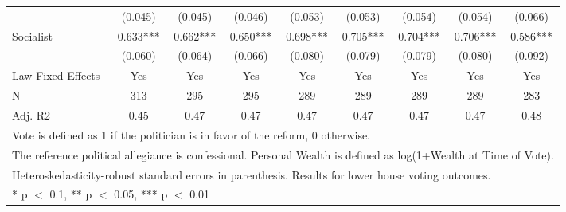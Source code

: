 \begin{table}
\begin{tabular}[t]{lcccccccc}
 & (\num{0.045}) & (\num{0.045}) & (\num{0.046}) & (\num{0.053}) & (\num{0.053}) & (\num{0.054}) & (\num{0.054}) & (\num{0.066})\\
Socialist & \num{0.633}*** & \num{0.662}*** & \num{0.650}*** & \num{0.698}*** & \num{0.705}*** & \num{0.704}*** & \num{0.706}*** & \num{0.586}***\\
 & (\num{0.060}) & (\num{0.064}) & (\num{0.066}) & (\num{0.080}) & (\num{0.079}) & (\num{0.079}) & (\num{0.080}) & (\num{0.092})\\
\midrule
Law Fixed Effects & Yes & Yes & Yes & Yes & Yes & Yes & Yes & Yes\\
N & \num{313} & \num{295} & \num{295} & \num{289} & \num{289} & \num{289} & \num{289} & \num{283}\\
Adj. R2 & \num{0.45} & \num{0.47} & \num{0.47} & \num{0.47} & \num{0.47} & \num{0.47} & \num{0.47} & \num{0.48}\\
\bottomrule
\multicolumn{9}{l}{\rule{0pt}{1em}Vote is defined as 1 if the politician is in favor of the reform, 0 otherwise.}\\
\multicolumn{9}{l}{\rule{0pt}{1em}The reference political allegiance is confessional. Personal Wealth is defined as log(1+Wealth at Time of Vote).}\\
\multicolumn{9}{l}{\rule{0pt}{1em}Heteroskedasticity-robust standard errors in parenthesis. Results for lower house voting outcomes.}\\
\multicolumn{9}{l}{\rule{0pt}{1em}* p $<$ 0.1, ** p $<$ 0.05, *** p $<$ 0.01}\\
\end{tabular}
\end{table}
